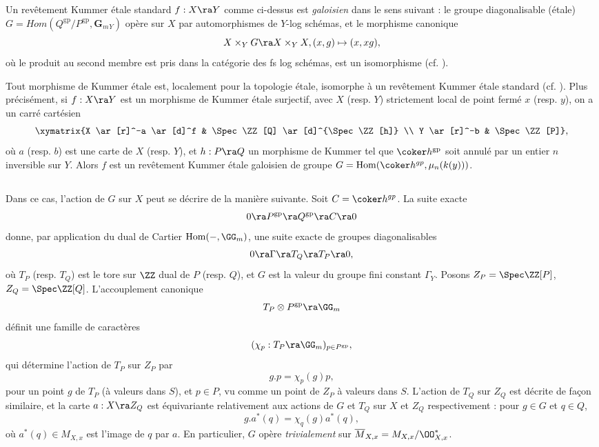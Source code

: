 \documentclass[10pt]{../fichiers-configuration-latex/smfart}
\begin{document}
Un revêtement Kummer étale standard $f : X \ra Y$ comme ci-dessus est \textit{galoisien} dans le
sens suivant : le groupe diagonalisable (étale) $G =
Hom(Q^{\mathrm{gp}}/P^{\mathrm{gp}},\mathbf{G}_{m}{}_{Y})$ opère sur $X$ par automorphismes de
$Y$-log schémas, et le morphisme canonique $$ X \times_Y G \ra X \times_Y X, (x,g) \mapsto (x,xg),
$$ où le produit au second membre est pris dans la catégorie des fs log schémas, est un isomorphisme
(cf. \cite[3.2]{Overview@Illusie}). 

Tout morphisme de Kummer étale est, localement pour la topologie étale, isomorphe à un revêtement
Kummer étale standard (cf. \cite[3.1.4]{Ket@Stix}). Plus précisément, si $f : X \ra Y$ est un
morphisme de Kummer étale surjectif, avec $X$ (resp. $Y$) strictement local de point fermé $x$
(resp. $y$), on a un carré cartésien $$ \xymatrix{X \ar[r]^-a \ar[d]^f & \Spec \ZZ[Q] \ar[d]^{\Spec
\ZZ[h]} \\ Y \ar[r]^-b & \Spec \ZZ[P]}, $$ où $a$ (resp. $b$) est une carte de $X$ (resp. $Y$), et $h
: P \ra Q$ un morphisme de Kummer tel que $\coker h^{\mathrm{gp}}$ soit annulé par un entier $n$
inversible sur $Y$. Alors $f$ est un revêtement Kummer étale galoisien de groupe $G =
\mathrm{Hom}(\coker h^{gp},\mu_n(k(y)))$.

\subsection{}\label{6-Kummer standard local} Dans ce cas, l'action de $G$ sur $X$ peut se décrire de
la manière suivante. Soit $C = \coker h^{gp}$. La suite exacte $$ 0 \ra P^{\mathrm{gp}} \ra
Q^{\mathrm{gp}} \ra C \ra 0 $$ donne, par application du dual de Cartier
$\mathrm{Hom}(-,\GG_m)$, une suite exacte de groupes diagonalisables $$ 0 \ra \Gamma \ra T_Q
\ra T_P \ra 0, $$ où $T_P$ (resp. $T_Q$) est le tore sur $\ZZ$ dual de $P$ (resp. $Q$), et $G$ est
la valeur du groupe fini constant $\Gamma_Y$. Posons $Z_P = \Spec \ZZ[P]$, $Z_Q = \Spec \ZZ[Q]$.
L'accouplement canonique $$ T_P \otimes P^{\mathrm{gp}} \ra \GG_m $$ définit une famille de
caractères $$ (\chi_p : T_P \ra \GG_m)_{p \in P^{\mathrm{gp}}}, $$ qui détermine l'action de
$T_P$ sur $Z_P$ par $$ g.p = \chi_p(g)p, $$ pour un point $g$ de $T_P$ (à valeurs dans $S$), et $p
\in P$, vu comme un point de $Z_P$ à valeurs dans $S$. L'action de $T_Q$ sur $Z_Q$ est décrite de
façon similaire, et la carte $a : X \ra Z_Q$ est équivariante relativement aux actions de $G$ et
$T_Q$ sur $X$ et $Z_Q$ respectivement : pour $g \in G$ et $q \in Q$, \begin{equation} g.a^*(q) =
\chi_q(g)a^*(q), \label{6-g.q} \end{equation} où $a^*(q) \in M_{X,x}$ est l'image de $q$ par $a$. En
particulier, $G$ opère \textit{trivialement} sur $\overline{M}_{X,x}= M_{X,x}/\OO^*_{X,x}$. 
\end{document}
